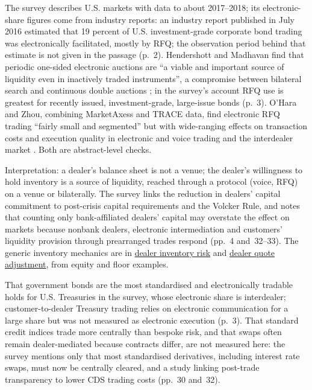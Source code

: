 \begin{qfdefinition}
 The survey describes U.S. markets with data to about 2017--2018; its electronic-share figures come from industry reports: an industry report published in July 2016 estimated that 19 percent of U.S. investment-grade corporate bond trading was electronically facilitated, mostly by RFQ; the observation period behind that estimate is not given in the passage (p.~2). Hendershott and Madhavan find that periodic one-sided electronic auctions are ``a viable and important source of liquidity even in inactively traded instruments'', a compromise between bilateral search and continuous double auctions \citep[abstract]{wide-hendershott-madhavan}; in the survey's account RFQ use is greatest for recently issued, investment-grade, large-issue bonds (p.~3). O'Hara and Zhou, combining MarketAxess and TRACE data, find electronic RFQ trading ``fairly small and segmented'' but with wide-ranging effects on transaction costs and execution quality in electronic and voice trading and the interdealer market \citep[abstract]{wide-ohara-zhou-electronic}. Both are abstract-level checks.

 Interpretation: a dealer's balance sheet is not a venue; the dealer's willingness to hold inventory is a source of liquidity, reached through a protocol (voice, RFQ) on a venue or bilaterally. The survey links the reduction in dealers' capital commitment to post-crisis capital requirements and the Volcker Rule, and notes that counting only bank-affiliated dealers' capital may overstate the effect on markets because nonbank dealers, electronic intermediation and customers' liquidity provision through prearranged trades respond (pp.~4 and~32--33). The generic inventory mechanics are in \hyperref[def:dealer-inventory-risk]{dealer inventory risk} and \hyperref[meth:dealer-quote-adjustment]{dealer quote adjustment}, from equity and floor examples.

 That government bonds are the most standardised and electronically tradable holds for U.S. Treasuries in the survey, whose electronic share is interdealer; customer-to-dealer Treasury trading relies on electronic communication for a large share but was not measured as electronic execution (p.~3). That standard credit indices trade more centrally than bespoke risk, and that swaps often remain dealer-mediated because contracts differ, are not measured here: the survey mentions only that most standardised derivatives, including interest rate swaps, must now be centrally cleared, and a study linking post-trade transparency to lower CDS trading costs (pp.~30 and~32).


\end{qfdefinition}
